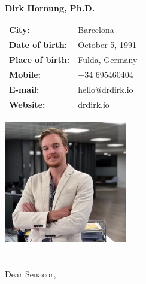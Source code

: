 \documentclass[11pt]{article}
\begin{document}
\Large
\noindent
\textbf{Dirk Hornung, Ph.D.} \\

\normalsize
\noindent
\begin{minipage}{0.5\linewidth}
  \begin{tabularx}{0.6\textwidth}{>{\bfseries}l l}
    City:           & Barcelona \\
    Date of birth:  & October 5, 1991\\
    Place of birth: & Fulda, Germany \\
    Mobile:         & +34 695460404 \\
    E-mail:         & hello@drdirk.io \\
    Website:      	& drdirk.io
  \end{tabularx}
\end{minipage}
\begin{minipage}{0.5\linewidth}
  \begin{flushright}
    \includegraphics[width=0.4\textwidth]{dirk.png}
  \end{flushright}
\end{minipage}
	


 \section*{}
 \vspace{1cm}
 Dear Senacor, \\
 
\end{document}
